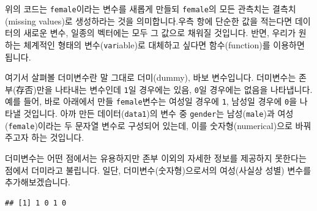 \documentclass[]{book}
\newenvironment{Shaded}{\begin{snugshade}}{\end{snugshade}}
\newcommand{\CommentTok}[1]{\textcolor[rgb]{0.56,0.35,0.01}{\textit{#1}}}
\newcommand{\DecValTok}[1]{\textcolor[rgb]{0.00,0.00,0.81}{#1}}
\newcommand{\KeywordTok}[1]{\textcolor[rgb]{0.13,0.29,0.53}{\textbf{#1}}}
\newcommand{\NormalTok}[1]{#1}
\newcommand{\OperatorTok}[1]{\textcolor[rgb]{0.81,0.36,0.00}{\textbf{#1}}}
\newcommand{\OtherTok}[1]{\textcolor[rgb]{0.56,0.35,0.01}{#1}}
\newcommand{\StringTok}[1]{\textcolor[rgb]{0.31,0.60,0.02}{#1}}
\begin{document}
\begin{Shaded}
\end{Shaded}

위의 코드는 \texttt{female}이라는 변수를 새롭게 만들되 \texttt{female}의 모든 관측치는 결측치(missing values)로 생성하라는 것을 의미합니다.우측 항에 단순한 값을 적는다면 데이터의 새로운 변수, 일종의 벡터에는 모두 그 값으로 채워질 것입니다. 반면, 우리가 원하는 체계적인 형태의 변수(\texttt{var}iable)로 대체하고 싶다면 함수(function)를 이용하면 됩니다.

여기서 살펴볼 더미변수란 말 그대로 더미(dummy), 바보 변수입니다. 더미변수는 존부(存否)만을 나타내는 변수인데 \texttt{1}일 경우에는 있음, \texttt{0}일 경우에는 없음을 나타냅니다. 예를 들어, 바로 아래에서 만들 \texttt{female}변수는 여성일 경우에 \texttt{1}, 남성일 경우에 \texttt{0}을 나타낼 것입니다. 아까 만든 데이터(\texttt{data1})의 변수 중 \texttt{gender}는 남성(\texttt{male})과 여성(\texttt{female})이라는 두 문자열 변수로 구성되어 있는데, 이를 숫자형(numerical)으로 바꿔주고자 하는 것입니다.

더미변수는 어떤 점에서는 유용하지만 존부 이외의 자세한 정보를 제공하지 못한다는 점에서 더미라고 불립니다. 일단, 더미변수(숫자형)으로서의 여성(사실상 성별) 변수를 추가해보겠습니다.

\begin{Shaded}
\end{Shaded}

\begin{verbatim}
## [1] 1 0 1 0
\end{verbatim}
\end{document}
